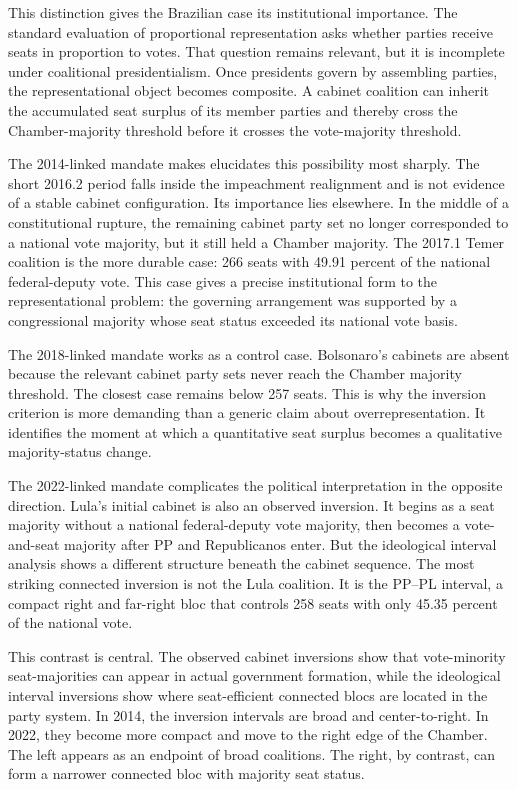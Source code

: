 \documentclass[11pt]{article}
\begin{document}
This distinction gives the Brazilian case its institutional importance. The
standard evaluation of proportional representation asks whether parties receive
seats in proportion to votes. That question remains relevant, but it is incomplete
under coalitional presidentialism. Once presidents govern by assembling parties,
the representational object becomes composite. A cabinet coalition can inherit
the accumulated seat surplus of its member parties and thereby cross the
Chamber-majority threshold before it crosses the vote-majority threshold. 

The 2014-linked mandate makes elucidates this possibility most sharply. The
short 2016.2 period falls inside the impeachment realignment and is not evidence
of a stable cabinet configuration. Its importance lies elsewhere. In the middle
of a constitutional rupture, the remaining cabinet party set no longer
corresponded to a national vote majority, but it still held a Chamber majority.
The 2017.1 Temer coalition is the more durable case: 266 seats with 49.91
percent of the national federal-deputy vote. This case gives a precise
institutional form to the representational problem: the governing arrangement
was supported by a congressional majority whose seat status exceeded its
national vote basis.

The 2018-linked mandate works as a control case. Bolsonaro's cabinets are absent
because the relevant cabinet party sets never reach the Chamber majority
threshold. The closest case remains below 257 seats. This is why the inversion
criterion is more demanding than a generic claim about overrepresentation. It
identifies the moment at which a quantitative seat surplus becomes a qualitative
majority-status change.

The 2022-linked mandate complicates the political interpretation in the opposite
direction. Lula's initial cabinet is also an observed inversion. It begins as a
seat majority without a national federal-deputy vote majority, then becomes a
vote-and-seat majority after PP and Republicanos enter. But the ideological
interval analysis shows a different structure beneath the cabinet sequence. The
most striking connected inversion is not the Lula coalition. It is the PP--PL
interval, a compact right and far-right bloc that controls 258 seats with only
45.35 percent of the national vote.

This contrast is central. The observed cabinet inversions show that vote-minority
seat-majorities can appear in actual government formation, while the ideological
interval inversions show where seat-efficient connected blocs are located in the
party system. In 2014, the inversion intervals are broad and center-to-right. In
2022, they become more compact and move to the right edge of the Chamber. The
left appears as an endpoint of broad coalitions. The right, by contrast, can form
a narrower connected bloc with majority seat status.
\end{document}
